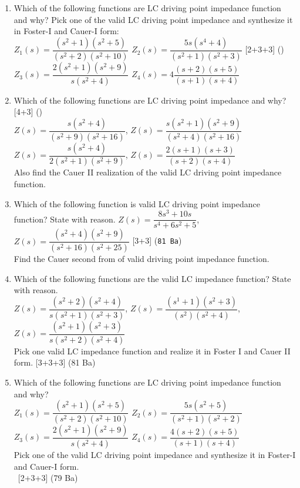 \documentclass[12pt]{article}
\newcommand{\enter}{\\\textcolor{white}{1}}
\begin{document}
\begin{enumerate}
				\item Which of the following functions are LC driving point impedance function and why? Pick one of the valid LC driving point impedance and synthesize it in Foster-I and Cauer-I form:\\
				$Z_1(s) = \dfrac{(s^2+1)(s^2+5)}{(s^2+2)(s^2+10)}$ \hspace{2cm}
				$Z_2(s) = \dfrac{5s(s^4+4)}{(s^2+1)(s^2+3)}$ \hfill [2+3+3] ()\\
				$Z_3(s) = \dfrac{2(s^2+1)(s^2+9)}{s(s^2+4)}$ \hspace{2cm}
				$Z_4(s) = 4\dfrac{(s+2)(s+5)}{(s+1)(s+4)}$
				
				\item Which of the following functions are LC driving point impedance and why? \hfill [4+3] ()\\
				$Z(s) = \dfrac{s(s^2+4)}{(s^2+9)(s^2+16)}$, \hspace{2cm}
				$Z(s) = \dfrac{s(s^2+1)(s^2+9)}{(s^2+4)(s^2+16)}$ \\
				$Z(s) = \dfrac{s(s^2+4)}{2(s^2+1)(s^2+9)}$, \hspace{2cm}
				$Z(s) = \dfrac{2(s+1)(s+3)}{(s+2)(s+4)}$\\
				Also find the Cauer II realization of the valid LC driving point impedance function.
				
				
				\item Which of the following function is valid LC driving point impedance function? State with reason.
				$Z(s) = \dfrac{8s^3+10s}{s^4+6s^2+5}$,\hspace*{1cm}    $Z(s) = \dfrac{(s^2+4)(s^2+9)}{(s^2+16)(s^2+25)}$ \hfill [3+3] (\texttt{81 Ba})\\
				Find the Cauer second from of valid driving point impedance function.
				
				\item Which of the following functions are the valid LC impedance function? State with reason.\\
				$Z(s) = \dfrac{(s^2+2)(s^2+4)}{s(s^2+1)(s^2+3)}$, \hspace{1cm} $Z(s) = \dfrac{(s^1+1)(s^2+3)}{(s^2)(s^2+4)}$, \hspace{1cm} $Z(s) = \dfrac{(s^2+1)(s^2+3)}{s(s^2+2)(s^2+4)}$\\
				Pick one valid LC impedance function and realize it in Foster I and Cauer II form. \hfill [3+3+3] (81 Ba)
				
				\item Which of the following functions are LC driving point impedance function and why?\\
				$Z_1 (s)=\dfrac{(s^2+1)(s^2+5)}{(s^2+2)(s^2+10)}$ \hspace{2cm}
				$Z_2 (s)=\dfrac{5s(s^2+5)}{(s^2+1)(s^2+2)}$\\[2pt]
				$Z_3 (s)=\dfrac{2(s^2+1)(s^2+9)}{s(s^2+4)}$ \hspace{2cm}
				$Z_4 (s)=\dfrac{4(s+2)(s+5)}{(s+1)(s+4)}$\\
				Pick one of the valid LC driving point impedance and synthesize it in Foster-I and Cauer-I form.
				\enter\hfill [2+3+3] (79 Ba)
				

\end{enumerate}
\end{document}
